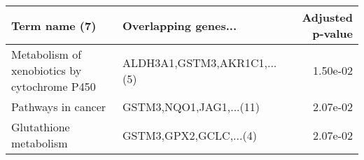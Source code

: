 \begin{tabular}{llr}
\toprule
                               Term name (7) &        Overlapping genes... &  Adjusted p-value \\
\midrule
Metabolism of xenobiotics by cytochrome P450 & ALDH3A1,GSTM3,AKR1C1,...(5) &          1.50e-02 \\
                          Pathways in cancer &     GSTM3,NQO1,JAG1,...(11) &          2.07e-02 \\
                      Glutathione metabolism &      GSTM3,GPX2,GCLC,...(4) &          2.07e-02 \\
\bottomrule
\end{tabular}
